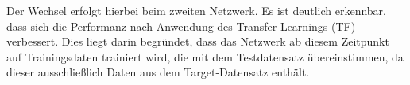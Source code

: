 Der Wechsel erfolgt hierbei beim zweiten Netzwerk. Es ist deutlich erkennbar, dass sich die Performanz nach Anwendung des Transfer Learnings 
(TF) verbessert. Dies liegt darin begründet, dass das Netzwerk ab diesem Zeitpunkt auf Trainingsdaten trainiert wird, die mit dem Testdatensatz 
übereinstimmen, da dieser ausschließlich Daten aus dem Target-Datensatz enthält.
